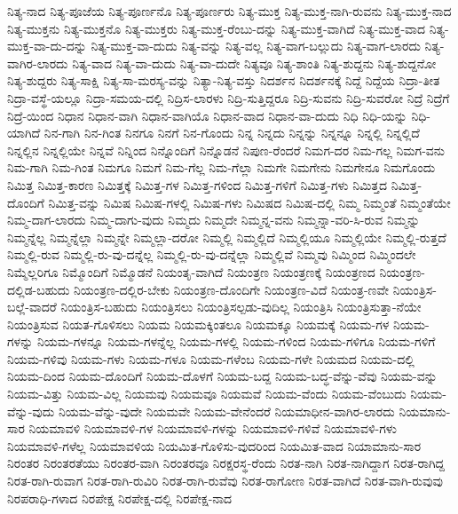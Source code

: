 {ನಿತ್ಯ-ನಾದ
ನಿತ್ಯ-ಪೂಜೆಯ
ನಿತ್ಯ-ಪೂರ್ಣನೊ
ನಿತ್ಯ-ಪೂರ್ಣರು
ನಿತ್ಯ-ಮುಕ್ತ
ನಿತ್ಯ-ಮುಕ್ತ-ನಾಗಿ-ರುವನು
ನಿತ್ಯ-ಮುಕ್ತ-ನಾದ
ನಿತ್ಯ-ಮುಕ್ತನು
ನಿತ್ಯ-ಮುಕ್ತನೊ
ನಿತ್ಯ-ಮುಕ್ತರು
ನಿತ್ಯ-ಮುಕ್ತ-ರೆಂಬು-ದನ್ನು
ನಿತ್ಯ-ಮುಕ್ತ-ವಾಗಿದೆ
ನಿತ್ಯ-ಮುಕ್ತ-ವಾದ
ನಿತ್ಯ-ಮುಕ್ತ-ವಾ-ದು-ದನ್ನು
ನಿತ್ಯ-ಮುಕ್ತ-ವಾ-ದುದು
ನಿತ್ಯ-ವನ್ನು
ನಿತ್ಯ-ವಲ್ಲ
ನಿತ್ಯ-ವಾಗ-ಬಲ್ಲುದು
ನಿತ್ಯ-ವಾಗ-ಲಾರದು
ನಿತ್ಯ-ವಾಗಿರ-ಲಾರದು
ನಿತ್ಯ-ವಾದ
ನಿತ್ಯ-ವಾ-ದುದು
ನಿತ್ಯ-ವಾ-ದುದೇ
ನಿತ್ಯವೂ
ನಿತ್ಯ-ಶಾಂತಿ
ನಿತ್ಯ-ಶುದ್ದನು
ನಿತ್ಯ-ಶುದ್ದನೋ
ನಿತ್ಯ-ಶುದ್ದರು
ನಿತ್ಯ-ಸಾಕ್ಷಿ
ನಿತ್ಯ-ಸಾ-ಮರಸ್ಯ-ವನ್ನು
ನಿತ್ಯಾ-ನಿತ್ಯ-ವಸ್ತು
ನಿದರ್ಶನ
ನಿದರ್ಶನಕ್ಕೆ
ನಿದ್ದೆ
ನಿದ್ದೆಯ
ನಿದ್ರಾ-ತೀತ
ನಿದ್ರಾ-ವಸ್ಥೆ-ಯಲ್ಲೂ
ನಿದ್ರಾ-ಸಮಯ-ದಲ್ಲಿ
ನಿದ್ರಿಸ-ಲಾರಳು
ನಿದ್ರಿ-ಸುತ್ತಿದ್ದರೂ
ನಿದ್ರಿ-ಸುವನು
ನಿದ್ರಿ-ಸುವರೋ
ನಿದ್ರೆ
ನಿದ್ರೆಗೆ
ನಿದ್ರೆ-ಯಿಂದ
ನಿಧಾನ
ನಿಧಾನ-ವಾಗಿ
ನಿಧಾನ-ವಾಗಿಯೊ
ನಿಧಾನ-ವಾದ
ನಿಧಾನ-ವಾ-ದುದು
ನಿಧಿ
ನಿಧಿ-ಯನ್ನು
ನಿಧಿ-ಯಾಗಿದೆ
ನಿನ-ಗಾಗಿ
ನಿನ-ಗಿಂತ
ನಿನಗೂ
ನಿನಗೆ
ನಿನ-ಗೊಂದು
ನಿನ್ನ
ನಿನ್ನದು
ನಿನ್ನನ್ನು
ನಿನ್ನನ್ನೂ
ನಿನ್ನಲ್ಲಿ
ನಿನ್ನಲ್ಲಿದೆ
ನಿನ್ನಲ್ಲಿನ
ನಿನ್ನಲ್ಲಿಯೇ
ನಿನ್ನವೆ
ನಿನ್ನಿಂದ
ನಿನ್ನೊಂದಿಗೆ
ನಿನ್ನೊಡನೆ
ನಿಪುಣ-ರೆಂದರೆ
ನಿಮಗ-ದರ
ನಿಮ-ಗಲ್ಲ
ನಿಮಗ-ವನು
ನಿಮ-ಗಾಗಿ
ನಿಮ-ಗಿಂತ
ನಿಮಗೂ
ನಿಮಗೆ
ನಿಮ-ಗೆಲ್ಲ
ನಿಮ-ಗೆಲ್ಲಾ
ನಿಮಗೇ
ನಿಮಗೇನು
ನಿಮಗೇನೂ
ನಿಮಗೊಂದು
ನಿಮಿತ್ತ
ನಿಮಿತ್ತ-ಕಾರಣ
ನಿಮಿತ್ತಕ್ಕೆ
ನಿಮಿತ್ತ-ಗಳ
ನಿಮಿತ್ತ-ಗಳಿಂದ
ನಿಮಿತ್ತ-ಗಳಿಗೆ
ನಿಮಿತ್ತ-ಗಳು
ನಿಮಿತ್ತದ
ನಿಮಿತ್ತ-ದೊಂದಿಗೆ
ನಿಮಿತ್ತ-ವನ್ನು
ನಿಮಿಷ
ನಿಮಿಷ-ಗಳಲ್ಲಿ
ನಿಮಿಷ-ಗಳು
ನಿಮಿಷದ
ನಿಮಿಷ-ದಲ್ಲಿ
ನಿಮ್ಮ
ನಿಮ್ಮಂತೆ
ನಿಮ್ಮಂತೆಯೇ
ನಿಮ್ಮ-ದಾಗ-ಲಾರದು
ನಿಮ್ಮ-ದಾಗು-ವುದು
ನಿಮ್ಮದು
ನಿಮ್ಮದೇ
ನಿಮ್ಮನ್ನ-ವನು
ನಿಮ್ಮನ್ನಾ-ವರಿ-ಸಿ-ರುವ
ನಿಮ್ಮನ್ನು
ನಿಮ್ಮನ್ನೆಲ್ಲ
ನಿಮ್ಮನ್ನೆಲ್ಲಾ
ನಿಮ್ಮನ್ನೇ
ನಿಮ್ಮಲ್ಲಾ-ದರೋ
ನಿಮ್ಮಲ್ಲಿ
ನಿಮ್ಮಲ್ಲಿದೆ
ನಿಮ್ಮಲ್ಲಿಯೂ
ನಿಮ್ಮಲ್ಲಿಯೇ
ನಿಮ್ಮಲ್ಲಿ-ರುತ್ತದೆ
ನಿಮ್ಮಲ್ಲಿ-ರುವ
ನಿಮ್ಮಲ್ಲಿ-ರು-ವು-ದನ್ನೆಲ್ಲ
ನಿಮ್ಮಲ್ಲಿ-ರು-ವು-ದನ್ನೆಲ್ಲಾ
ನಿಮ್ಮಲ್ಲಿವೆ
ನಿಮ್ಮವು
ನಿಮ್ಮಿಂದ
ನಿಮ್ಮಿಂದಲೇ
ನಿಮ್ಮೆಲ್ಲರಿಗೂ
ನಿಮ್ಮೊಂದಿಗೆ
ನಿಮ್ಮೊಡನೆ
ನಿಯಂತೃ-ವಾಗಿದೆ
ನಿಯಂತ್ರಣ
ನಿಯಂತ್ರಣಕ್ಕೆ
ನಿಯಂತ್ರಣದ
ನಿಯಂತ್ರಣ-ದಲ್ಲಿಡ-ಬಹುದು
ನಿಯಂತ್ರಣ-ದಲ್ಲಿರ-ಬೇಕು
ನಿಯಂತ್ರಣ-ದೊಂದಿಗೇ
ನಿಯಂತ್ರಣ-ವಿದೆ
ನಿಯಂತ್ರ-ಣವೇ
ನಿಯಂತ್ರಿಸ-ಬಲ್ಲೆ-ವಾದರೆ
ನಿಯಂತ್ರಿಸ-ಬಹುದು
ನಿಯಂತ್ರಿಸಲು
ನಿಯಂತ್ರಿಸಲ್ಪಡು-ವುದಿಲ್ಲ
ನಿಯಂತ್ರಿಸಿ
ನಿಯಂತ್ರಿಸುತ್ತಾ-ನೆಯೇ
ನಿಯಂತ್ರಿಸುವ
ನಿಯತ-ಗೊಳಿಸಲು
ನಿಯಮ
ನಿಯಮಕ್ಕಿಂತಲೂ
ನಿಯಮಕ್ಕೂ
ನಿಯಮಕ್ಕೆ
ನಿಯಮ-ಗಳ
ನಿಯಮ-ಗಳನ್ನು
ನಿಯಮ-ಗಳನ್ನೂ
ನಿಯಮ-ಗಳನ್ನೆಲ್ಲ
ನಿಯಮ-ಗಳಲ್ಲಿ
ನಿಯಮ-ಗಳಿಂದ
ನಿಯಮ-ಗಳಿಗೂ
ನಿಯಮ-ಗಳಿಗೆ
ನಿಯಮ-ಗಳಿವು
ನಿಯಮ-ಗಳು
ನಿಯಮ-ಗಳೂ
ನಿಯಮ-ಗಳೆಂಬ
ನಿಯಮ-ಗಳೇ
ನಿಯಮದ
ನಿಯಮ-ದಲ್ಲಿ
ನಿಯಮ-ದಿಂದ
ನಿಯಮ-ದೊಂದಿಗೆ
ನಿಯಮ-ದೊಳಗೆ
ನಿಯಮ-ಬದ್ದ
ನಿಯಮ-ಬದ್ಧ-ವೆನ್ನು-ವೆವು
ನಿಯಮ-ವನ್ನು
ನಿಯಮ-ವಿತ್ತು
ನಿಯಮ-ವಿಲ್ಲ
ನಿಯಮವು
ನಿಯಮವೂ
ನಿಯಮವೆ
ನಿಯಮ-ವೆಂದು
ನಿಯಮ-ವೆಂಬುದು
ನಿಯಮ-ವೆನ್ನು-ವುದು
ನಿಯಮ-ವೆನ್ನು-ವುದೇ
ನಿಯಮವೇ
ನಿಯಮ-ವೇನೆಂದರೆ
ನಿಯಮಾಧೀನ-ವಾಗಿರ-ಲಾರದು
ನಿಯಮಾನು-ಸಾರ
ನಿಯಮಾವಳಿ
ನಿಯಮಾವಳಿ-ಗಳ
ನಿಯಮಾವಳಿ-ಗಳನ್ನು
ನಿಯಮಾವಳಿ-ಗಳಿವೆ
ನಿಯಮಾವಳಿ-ಗಳು
ನಿಯಮಾವಳಿ-ಗಳೆಲ್ಲ
ನಿಯಮಾವಳಿಯ
ನಿಯಮಿತ-ಗೊಳಿಸು-ವುದರಿಂದ
ನಿಯಮಿತ-ವಾದ
ನಿಯಾಮಾನು-ಸಾರ
ನಿರಂತರ
ನಿರಂತರತೆಯು
ನಿರಂತರ-ವಾಗಿ
ನಿರಂತರವೂ
ನಿರಕ್ಷರಸ್ಥ-ರೆಂದು
ನಿರತ-ನಾಗಿ
ನಿರತ-ನಾಗಿದ್ದಾಗ
ನಿರತ-ರಾಗಿದ್ದ
ನಿರತ-ರಾಗಿ-ರುವಾಗ
ನಿರತ-ರಾಗಿ-ರುವಿರಿ
ನಿರತ-ರಾಗಿ-ರುವೆವು
ನಿರತ-ರಾಗೋಣ
ನಿರತ-ವಾಗಿದೆ
ನಿರತ-ವಾಗಿ-ರುವುವು
ನಿರಪರಾಧಿ-ಗಳಾದ
ನಿರಪೇಕ್ಷ
ನಿರಪೇಕ್ಷ-ದಲ್ಲಿ
ನಿರಪೇಕ್ಷ-ನಾದ
}
